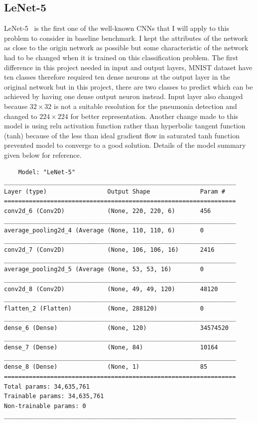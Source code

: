 \subsection{LeNet-5}
LeNet-5~\cite{Lenet5} is the first one of the well-known CNNs that I will apply to this problem to consider in baseline benchmark.
I kept the attributes of the network as close to the origin network as possible but some characteristic of the network had to be changed when it is trained on this classification problem.
The first difference in this project needed in input and output layers, MNIST dataset have ten classes therefore required ten dense neurons at the output layer in the original network but in this project, there are two classes to predict which can be achieved by having one dense output neuron instead.
Input layer also changed because $32 \times 32$ is not a suitable resolution for the pneumonia detection and changed to $224 \times 224$ for better representation.
Another change made to this model is using relu activation function rather than hyperbolic tangent function (tanh) because of the less than ideal gradient flow in saturated tanh function prevented model to converge to a good solution.
Details of the model summary given below for reference.

\begin{verbatim}
    Model: "LeNet-5"
_________________________________________________________________
Layer (type)                 Output Shape              Param #   
=================================================================
conv2d_6 (Conv2D)            (None, 220, 220, 6)       456       
_________________________________________________________________
average_pooling2d_4 (Average (None, 110, 110, 6)       0         
_________________________________________________________________
conv2d_7 (Conv2D)            (None, 106, 106, 16)      2416      
_________________________________________________________________
average_pooling2d_5 (Average (None, 53, 53, 16)        0         
_________________________________________________________________
conv2d_8 (Conv2D)            (None, 49, 49, 120)       48120     
_________________________________________________________________
flatten_2 (Flatten)          (None, 288120)            0         
_________________________________________________________________
dense_6 (Dense)              (None, 120)               34574520  
_________________________________________________________________
dense_7 (Dense)              (None, 84)                10164     
_________________________________________________________________
dense_8 (Dense)              (None, 1)                 85        
=================================================================
Total params: 34,635,761
Trainable params: 34,635,761
Non-trainable params: 0
_________________________________________________________________
\end{verbatim}

